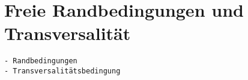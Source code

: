 %
%
%
\section{Freie Randbedingungen und Transversalität
\label{buch:nebenbedingungen:section:transversl}}

\begin{verbatim}
- Randbedingungen
- Transversalitätsbedingung
\end{verbatim}
